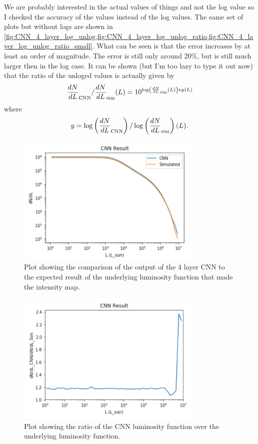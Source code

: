 \documentclass{article}
\begin{document}
			We are probably interested in the actual values of things and not the log value so I checked the accuracy of the values instead of the log values.  The same set of plots but without logs are shown in \cref{fig:CNN_4_layer_log_unlog,fig:CNN_4_layer_log_unlog_ratio,fig:CNN_4_layer_log_unlog_ratio_small}.  What can be seen is that the error increases by at least an order of magnitude.  The error is still only around 20\%, but is still much larger then in the log case.  It can be shown (but I'm too lazy to type it out now) that the ratio of the unloged values is actually given by
			\begin{equation}
				\frac{dN}{dL}_{\rm{CNN}} / \frac{dN}{dL}_{\rm{sim}}(L) = 10^{\log \left(\frac{dN}{dL}_{\rm{sim}} (L)\right) * y(L)}
			\end{equation}
			where 
			\begin{equation}
				y = \log \left( \frac{dN}{dL}_{\rm{CNN}} \right) / \log \left( \frac{dN}{dL}_{\rm{sim}} \right)(L).
			\end{equation}

			\begin{figure}[H]
				\centering
				\includegraphics[width=0.8\textwidth]{CNN_4_layer_log_unlog.pdf}
				\caption{Plot showing the comparison of the output of the 4 layer CNN to the expected result of the underlying luminosity function that made the intensity map.}
				\label{fig:CNN_4_layer_log_unlog}
			\end{figure}

			\begin{figure}[H]
				\centering
				\includegraphics[width=0.8\textwidth]{CNN_4_layer_log_unlog_ratio.pdf}
				\caption{Plot showing the ratio of the CNN luminosity function over the underlying luminosity function.}
				\label{fig:CNN_4_layer_log_unlog_ratio}
			\end{figure}
\end{document}
